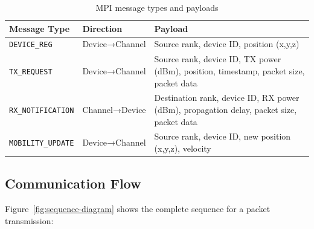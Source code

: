 \begin{table}[htbp]
\centering
\caption{MPI message types and payloads}
\label{tab:mpi-messages}
\begin{tabular}{@{}llp{6cm}@{}}
\toprule
\textbf{Message Type} & \textbf{Direction} & \textbf{Payload} \\
\midrule
\texttt{DEVICE\_REG} & Device→Channel & Source rank, device ID, position (x,y,z) \\
\texttt{TX\_REQUEST} & Device→Channel & Source rank, device ID, TX power (dBm), position, timestamp, packet size, packet data \\
\texttt{RX\_NOTIFICATION} & Channel→Device & Destination rank, device ID, RX power (dBm), propagation delay, packet size, packet data \\
\texttt{MOBILITY\_UPDATE} & Device→Channel & Source rank, device ID, new position (x,y,z), velocity \\
\bottomrule
\end{tabular}
\end{table}

\subsection{Communication Flow}

Figure~\ref{fig:sequence-diagram} shows the complete sequence for a packet transmission:

